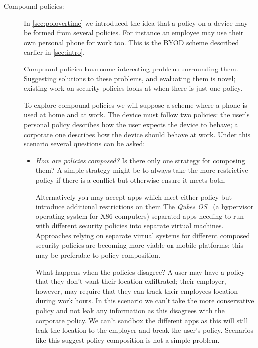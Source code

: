 \documentclass[a4paper,sfsidenotes]{%
  scrartcl%
}
\begin{document}
\begin{description}
  \item[Compound policies:] In \autoref{sec:polovertime} we introduced the idea that a policy on a
    device may be formed from several policies.  For instance an
    employee may use their own personal phone for work too.  This is the
    \ac{BYOD} scheme described earlier in \autoref{sec:intro}.
    
    Compound policies have some interesting problems surrounding them.
    Suggesting solutions to these problems, and evaluating them is novel;
    existing work on security policies looks at when there is just one policy.

    To explore compound policies we will suppose a scheme where a phone is used
    at home and at work.  The device must follow two policies: the user's
    personal policy describes how the user expects the device to behave; a
    corporate one describes how the device should behave at work.  Under this
    scenario several questions can be asked:

    \begin{itemize}
    
      \item \emph{How are policies composed?}  Is there only one strategy for
        composing them?  A simple strategy might be to always take the more
        restrictive policy if there is a conflict but otherwise ensure it meets
        both.  
        
        Alternatively you may accept apps which meet either policy but
        introduce additional restrictions on them
        The \emph{Qubes OS}~\cite{Rutkowska:2010wr} (a hypervisor
        operating system for X86 computers) separated apps needing to run with
        different security policies into separate virtual machines.  Approaches
        relying on separate virtual systems for different composed security
        policies are becoming more viable on mobile platforms; this may be
        preferable to policy composition.

        What happens when the policies disagree?  A user may have a policy that
        they don't want their location exfiltrated; their employer, however, may
        require that they can track their employees location during work hours.  
        In this scenario we can't take the more conservative policy and not leak
        any information as this disagrees with the corporate policy.  We can't
        sandbox the different apps as this will still leak the location to the
        employer and break the user's policy.  Scenarios like this suggest
        policy composition is not a simple problem.


\end{itemize}
\end{description}
\end{document}
